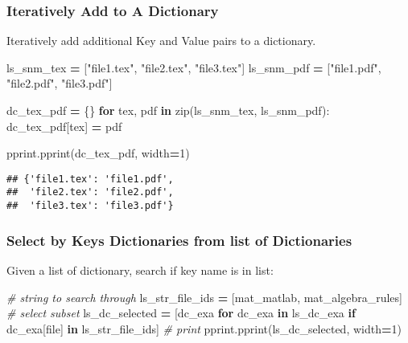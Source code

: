 \documentclass[
]{book}
\newenvironment{Shaded}{\begin{snugshade}}{\end{snugshade}}
\newcommand{\BuiltInTok}[1]{#1}
\newcommand{\CommentTok}[1]{\textcolor[rgb]{0.56,0.35,0.01}{\textit{#1}}}
\newcommand{\ControlFlowTok}[1]{\textcolor[rgb]{0.13,0.29,0.53}{\textbf{#1}}}
\newcommand{\DecValTok}[1]{\textcolor[rgb]{0.00,0.00,0.81}{#1}}
\newcommand{\KeywordTok}[1]{\textcolor[rgb]{0.13,0.29,0.53}{\textbf{#1}}}
\newcommand{\NormalTok}[1]{#1}
\newcommand{\OperatorTok}[1]{\textcolor[rgb]{0.81,0.36,0.00}{\textbf{#1}}}
\newcommand{\StringTok}[1]{\textcolor[rgb]{0.31,0.60,0.02}{#1}}
\begin{document}
\hypertarget{iteratively-add-to-a-dictionary}{%
\subsubsection{Iteratively Add to A Dictionary}\label{iteratively-add-to-a-dictionary}}

Iteratively add additional Key and Value pairs to a dictionary.

\begin{Shaded}
\begin{Highlighting}[]
\NormalTok{ls\_snm\_tex }\OperatorTok{=}\NormalTok{ [}\StringTok{"file1.tex"}\NormalTok{, }\StringTok{"file2.tex"}\NormalTok{, }\StringTok{"file3.tex"}\NormalTok{]}
\NormalTok{ls\_snm\_pdf }\OperatorTok{=}\NormalTok{ [}\StringTok{"file1.pdf"}\NormalTok{, }\StringTok{"file2.pdf"}\NormalTok{, }\StringTok{"file3.pdf"}\NormalTok{]}

\NormalTok{dc\_tex\_pdf }\OperatorTok{=}\NormalTok{ \{\}}
\ControlFlowTok{for}\NormalTok{ tex, pdf }\KeywordTok{in} \BuiltInTok{zip}\NormalTok{(ls\_snm\_tex, ls\_snm\_pdf):}
\NormalTok{  dc\_tex\_pdf[tex] }\OperatorTok{=}\NormalTok{ pdf}

\NormalTok{pprint.pprint(dc\_tex\_pdf, width}\OperatorTok{=}\DecValTok{1}\NormalTok{)}
\end{Highlighting}
\end{Shaded}

\begin{verbatim}
## {'file1.tex': 'file1.pdf',
##  'file2.tex': 'file2.pdf',
##  'file3.tex': 'file3.pdf'}
\end{verbatim}

\hypertarget{select-by-keys-dictionaries-from-list-of-dictionaries}{%
\subsubsection{Select by Keys Dictionaries from list of Dictionaries}\label{select-by-keys-dictionaries-from-list-of-dictionaries}}

Given a list of dictionary, search if key name is in list:

\begin{Shaded}
\begin{Highlighting}[]
\CommentTok{\# string to search through}
\NormalTok{ls\_str\_file\_ids }\OperatorTok{=}\NormalTok{ [}\StringTok{\textquotesingle{}mat\_matlab\textquotesingle{}}\NormalTok{, }\StringTok{\textquotesingle{}mat\_algebra\_rules\textquotesingle{}}\NormalTok{]}
\CommentTok{\# select subset}
\NormalTok{ls\_dc\_selected }\OperatorTok{=}\NormalTok{ [dc\_exa}
                  \ControlFlowTok{for}\NormalTok{ dc\_exa }\KeywordTok{in}\NormalTok{ ls\_dc\_exa}
                  \ControlFlowTok{if}\NormalTok{ dc\_exa[}\StringTok{\textquotesingle{}file\textquotesingle{}}\NormalTok{] }\KeywordTok{in}\NormalTok{ ls\_str\_file\_ids]}
\CommentTok{\# print}
\NormalTok{pprint.pprint(ls\_dc\_selected, width}\OperatorTok{=}\DecValTok{1}\NormalTok{)}
\end{Highlighting}
\end{Shaded}
\end{document}
